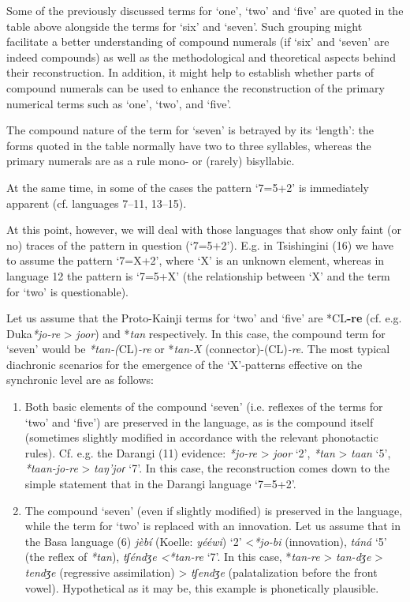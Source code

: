 \newpage 
Some of the previously discussed terms for ‘one’, ‘two’ and ‘five’ are quoted in the table above alongside the terms for ‘six’ and ‘seven’. Such grouping might facilitate a better understanding of compound numerals (if ‘six’ and ‘seven’ are indeed compounds) as well as the methodological and theoretical aspects behind their reconstruction. In addition, it might help to establish whether parts of compound numerals can be used to enhance the reconstruction of the primary numerical terms such as ‘one’, ‘two’, and ‘five’.

The compound nature of the term for ‘seven’ is betrayed by its ‘length’: the forms quoted in the table normally have two to three syllables, whereas the primary numerals are as a rule mono- or (rarely) bisyllabic.

At the same time, in some of the cases the pattern ‘7=5+2’ is immediately apparent (cf. languages 7--11, 13--15). 

At this point, however, we will deal with those languages that show only faint (or no) traces of the pattern in question (‘7=5+2’). E.g. in Tsishingini (16) we have to assume the pattern ‘7=X+2’, where ‘X’ is an unknown element, whereas in language 12 the pattern is ‘7=5+X’ (the relationship between ‘X’ and the term for ‘two’ is questionable). 

Let us assume that the Proto-Kainji terms for ‘two’ and ‘five’ are *CL\textbf{-re}  (cf. e.g. Duka\textit{*jo-re} > \textit{joor}) and *\textit{tan} respectively. In this case, the compound term for ‘seven’ would be \textit{*tan-(}CL)\textit{-re} or *\textit{tan-X} (connector)-(CL)\textit{-re}. The most typical diachronic scenarios for the emergence of the ‘X’-patterns effective on the synchronic level are as follows:

\begin{enumerate}
\item Both basic elements of the compound ‘seven’ (i.e. reflexes of the terms for ‘two’ and ‘five’) are preserved in the language, as is the compound itself (sometimes slightly modified in accordance with the relevant phonotactic rules). Cf. e.g. the Darangi (11) evidence: \textit{*jo-re} > \textit{joor} ‘2’, \textit{*tan} > \textit{taan} ‘5’, \textit{*taan-jo-re} > \textit{taŋ’joɾ} ‘7’. In this case, the reconstruction comes down to the simple statement that in the Darangi language ‘7=5+2’.
\item The compound ‘seven’ (even if slightly modified) is preserved in the language, while the term for ‘two’ is replaced with an innovation. Let us assume that in the Basa language (6) \textit{jèbí} (Koelle: \textit{yééwi}) ‘2’ <\textit{*jo-bi} (innovation), \textit{táná} ‘5’ (the reflex of \textit{*tan}), \textit{tʃéndʒe <}\textit{*tan-re} ‘7’. In this case, *\textit{tan-re} > \textit{tan-dʒe} > \textit{tendʒe} (regressive assimilation) > \textit{tʃendʒe} (palatalization before the front vowel). Hypothetical as it may be, this example is phonetically plausible.
\end{enumerate}


